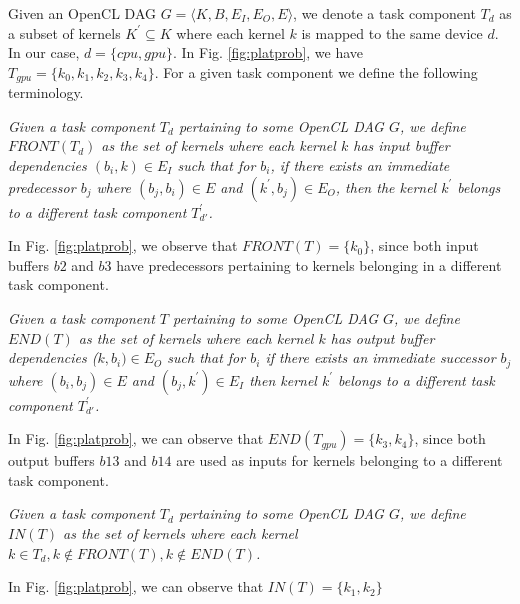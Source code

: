 	\par Given an OpenCL DAG $G=\langle K,B,E_I,E_O,E \rangle$, we denote a task component $T_d$ as a subset of kernels $K^\prime \subseteq K$  where each kernel $k$ is mapped to the same device $d$. In our case, $d= \{ cpu,gpu \}$. In Fig. \ref{fig:platprob}, we have $T_{gpu} = \{k_0,k_1,k_2,k_3,k_4 \}$. For a given task component we define the following terminology.
	\begin{definition}
		\emph{Given a task component $T_d$ pertaining to some OpenCL DAG $G$, we define $FRONT(T_d)$ as the set of kernels where each kernel $k$ has input buffer dependencies $(b_i,k) \in E_I$ such that for $b_i$, if there exists an immediate predecessor $b_j$ where $(b_j,b_i)\in E$ and $(k^\prime,b_j) \in E_O$, then the kernel $k^\prime$ belongs to a different task component $T^\prime_{d'}$.} 
	\end{definition}
	In Fig. \ref{fig:platprob}, we observe that $FRONT(T) = \{ k_0\}$, since both input buffers $b2$ and $b3$ have predecessors pertaining to kernels belonging in a different task component. 
	\begin{definition}\emph{
		Given a task component $T$ pertaining to some OpenCL DAG $G$, we define $END(T)$ as the set of kernels where each kernel $k$ has output buffer dependencies ($k,b_i) \in E_O$ such that for $b_i$ if there exists an immediate successor $b_j$ where $(b_i,b_j)\in E$ and $(b_j,k^\prime) \in E_I$ then kernel $k^\prime$ belongs to a different task component $T^\prime_{d'}$.}
	\end{definition}
	In Fig. \ref{fig:platprob}, we can observe that $END(T_{gpu})=\{k_3,k_4\}$, since both output buffers $b13$ and $b14$ are used as inputs for kernels belonging to a different task component.
	\begin{definition}\emph{
		Given a task component $T_d$ pertaining to some OpenCL DAG $G$, we define $IN(T)$ as the set of kernels where each kernel $k \in T_d, k \notin FRONT(T), k \notin END(T)$. } 
	\end{definition}
	In Fig. \ref{fig:platprob}, we can observe that $IN(T)=\{k_1, k_2 \}$
	
